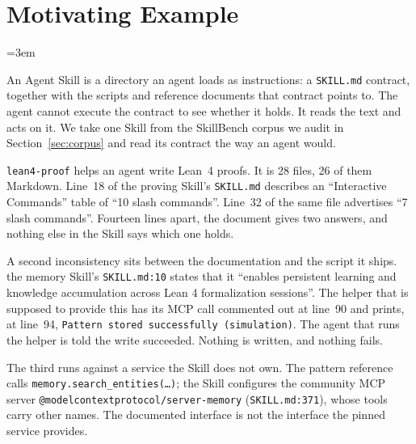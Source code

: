 \section{Motivating Example}
\label{sec:motivation}
%
\begingroup\emergencystretch=3em

An Agent Skill is a directory an agent loads as instructions: a \texttt{SKILL.md}
contract, together with the scripts and reference documents that contract points
to. The agent cannot execute the contract to see whether it holds. It reads the
text and acts on it. We take one Skill from the SkillBench corpus we audit in
Section~\ref{sec:corpus} and read its contract the way an agent would.

\texttt{lean4-proof} helps an agent write Lean~4 proofs. It is 28 files, 26 of
them Markdown. Line~18 of the proving Skill's \texttt{SKILL.md} describes an ``Interactive
Commands'' table of ``10 slash commands''. Line~32 of the same file advertises
``7 slash commands''. Fourteen lines apart, the document gives
two answers, and nothing else in the Skill says which one holds.

A second inconsistency sits between the documentation and the script it ships.
the memory Skill's \texttt{SKILL.md:10} states that it ``enables persistent
learning and knowledge accumulation across Lean 4 formalization sessions''. The
helper that is supposed to provide this has its MCP call commented out at
line~90 and prints, at line~94, \texttt{Pattern stored successfully
(simulation)}. The agent that runs the helper is told the write
succeeded. Nothing is written, and nothing fails.

The third runs against a service the Skill does not own. The pattern reference
calls \texttt{memory.\allowbreak{}search\_\allowbreak{}entities(\ldots)}; the Skill configures the
community MCP server \texttt{@modelcontext\allowbreak{}protocol/\allowbreak{}server-\allowbreak{}memory}
(\texttt{SKILL.md:371}), whose tools carry other names. The documented
interface is not the interface the pinned service provides.

